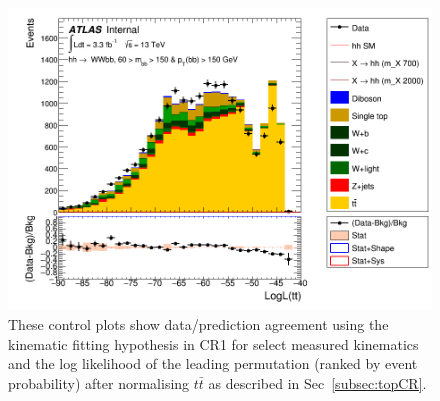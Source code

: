\begin{figure}[!hb]
\begin{center}
                \includegraphics[width=.47\textwidth]{figures/kinFit_appendix/bbpt150_NF1168/C_mBBcr_opt700_bbpt150_LogLikelihood_ttbar}
	\caption{These control plots show data/prediction agreement using the \ttbar kinematic fitting hypothesis in CR1 for select measured kinematics and the log likelihood of the leading permutation (ranked by event probability) after normalising $t\bar{t}$ as described in Sec~\ref{subsec:topCR}.}
	\label{fig:klfitter_control_plots_bbpt150_nf1168}
	\end{center}    
	\end{figure}


